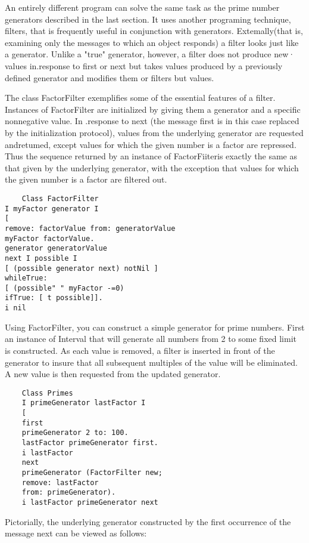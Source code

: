 
An entirely different program can solve the same task as the prime number
generators described in the last section. It uses another programing technique,
filters, that is frequently useful in conjunction with generators.
Extemally(that is, examining only the messages to which an object responds) a
filter looks just like a generator. Unlike a "true" generator, however, a filter
does not produce new· values in.response to first or next but takes values
produced by a previously defined generator and modifies them or filters but
values.

The class FactorFilter exemplifies some of the essential features of a filter.
Instances of FactorFilter are initialized by giving them a generator and a
specific nonnegative value. In .response to next (the message first is in this
case replaced by the initialization protocol), values from the underlying
generator are requested andretumed, except values for which the given number is
a factor are repressed. Thus the sequence returned by an instance of
FactorFiiteris exactly the same as that given by the underlying generator, with
the exception that values for which the given number is a factor are filtered
out.

\begin{lstlisting}
    Class FactorFilter
I myFactor generator I
[
remove: factorValue from: generatorValue
myFactor factorValue.
generator generatorValue
next I possible I
[ (possible generator next) notNil ]
whileTrue:
[ (possible" " myFactor -=0)
ifTrue: [ t possible]].
i nil
\end{lstlisting}

Using FactorFilter, you can construct a simple generator for prime numbers.
First an instance of Interval that will generate all numbers from 2 to some
fixed limit is constructed. As each value is removed, a filter is inserted in
front of the generator to insure that all subsequent multiples of the value will
be eliminated. A new value is then requested from the updated generator.

\begin{lstlisting}
    Class Primes
    I primeGenerator lastFactor I
    [
    first
    primeGenerator 2 to: 100.
    lastFactor primeGenerator first.
    i lastFactor
    next
    primeGenerator (FactorFilter new;
    remove: lastFactor
    from: primeGenerator).
    i lastFactor primeGenerator next    
\end{lstlisting}

Pictorially, the underlying generator constructed by the first occurrence of the
message next can be viewed as follows:

